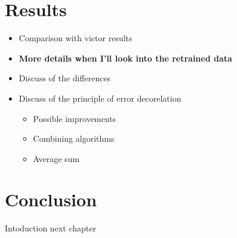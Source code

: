 \section{Results}

\begin{itemize}
  \item Comparison with victor results
  \item \textbf{More details when I'll look into the retrained data}
  \item Discuss of the differences
  \item Discuss of the principle of error decorelation
    \begin{itemize}
      \item Possible improvements
      \item Combining algorithms
      \item Average sum
    \end{itemize}
\end{itemize}

\section{Conclusion}
Intoduction next chapter
